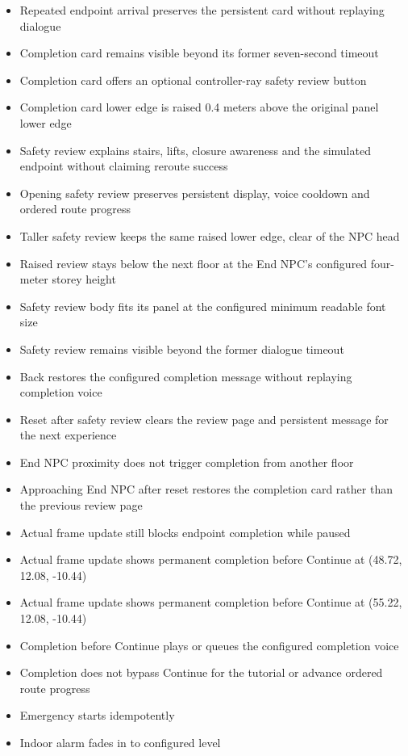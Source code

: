\documentclass[12pt,a4paper]{article}
\begin{document}
\begin{itemize}[leftmargin=*,nosep]
\item Repeated endpoint arrival preserves the persistent card without replaying dialogue
\item Completion card remains visible beyond its former seven-second timeout
\item Completion card offers an optional controller-ray safety review button
\item Completion card lower edge is raised 0.4 meters above the original panel lower edge
\item Safety review explains stairs, lifts, closure awareness and the simulated endpoint without claiming reroute success
\item Opening safety review preserves persistent display, voice cooldown and ordered route progress
\item Taller safety review keeps the same raised lower edge, clear of the NPC head
\item Raised review stays below the next floor at the End NPC's configured four-meter storey height
\item Safety review body fits its panel at the configured minimum readable font size
\item Safety review remains visible beyond the former dialogue timeout
\item Back restores the configured completion message without replaying completion voice
\item Reset after safety review clears the review page and persistent message for the next experience
\item End NPC proximity does not trigger completion from another floor
\item Approaching End NPC after reset restores the completion card rather than the previous review page
\item Actual frame update still blocks endpoint completion while paused
\item Actual frame update shows permanent completion before Continue at (48.72, 12.08, -10.44)
\item Actual frame update shows permanent completion before Continue at (55.22, 12.08, -10.44)
\item Completion before Continue plays or queues the configured completion voice
\item Completion does not bypass Continue for the tutorial or advance ordered route progress
\item Emergency starts idempotently
\item Indoor alarm fades in to configured level

\end{itemize}
\end{document}
